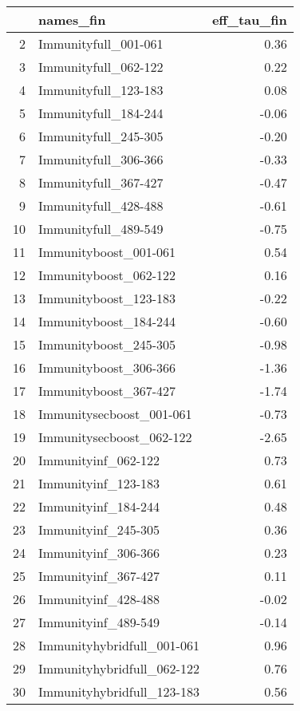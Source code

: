\begin{table}[ht]
\centering
\begin{tabular}{rlr}
  \hline
 & names\_fin & eff\_tau\_fin \\ 
  \hline
2 & Immunityfull\_001-061 & 0.36 \\ 
  3 & Immunityfull\_062-122 & 0.22 \\ 
  4 & Immunityfull\_123-183 & 0.08 \\ 
  5 & Immunityfull\_184-244 & -0.06 \\ 
  6 & Immunityfull\_245-305 & -0.20 \\ 
  7 & Immunityfull\_306-366 & -0.33 \\ 
  8 & Immunityfull\_367-427 & -0.47 \\ 
  9 & Immunityfull\_428-488 & -0.61 \\ 
  10 & Immunityfull\_489-549 & -0.75 \\ 
  11 & Immunityboost\_001-061 & 0.54 \\ 
  12 & Immunityboost\_062-122 & 0.16 \\ 
  13 & Immunityboost\_123-183 & -0.22 \\ 
  14 & Immunityboost\_184-244 & -0.60 \\ 
  15 & Immunityboost\_245-305 & -0.98 \\ 
  16 & Immunityboost\_306-366 & -1.36 \\ 
  17 & Immunityboost\_367-427 & -1.74 \\ 
  18 & Immunitysecboost\_001-061 & -0.73 \\ 
  19 & Immunitysecboost\_062-122 & -2.65 \\ 
  20 & Immunityinf\_062-122 & 0.73 \\ 
  21 & Immunityinf\_123-183 & 0.61 \\ 
  22 & Immunityinf\_184-244 & 0.48 \\ 
  23 & Immunityinf\_245-305 & 0.36 \\ 
  24 & Immunityinf\_306-366 & 0.23 \\ 
  25 & Immunityinf\_367-427 & 0.11 \\ 
  26 & Immunityinf\_428-488 & -0.02 \\ 
  27 & Immunityinf\_489-549 & -0.14 \\ 
  28 & Immunityhybridfull\_001-061 & 0.96 \\ 
  29 & Immunityhybridfull\_062-122 & 0.76 \\ 
  30 & Immunityhybridfull\_123-183 & 0.56 \\ 

\end{tabular}
\end{table}
